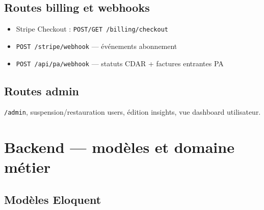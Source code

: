 \documentclass[11pt,a4paper]{report}
\begin{document}
\section{Routes billing et webhooks}

\begin{itemize}[leftmargin=1.5em]
    \item Stripe Checkout : \texttt{POST/GET /billing/checkout}
    \item \texttt{POST /stripe/webhook} — événements abonnement
    \item \texttt{POST /api/pa/webhook} — statuts CDAR + factures entrantes PA
\end{itemize}

\section{Routes admin}

\texttt{/admin}, suspension/restauration users, édition insights, vue dashboard utilisateur.

\chapter{Backend — modèles et domaine métier}

\section{Modèles Eloquent}
\end{document}
